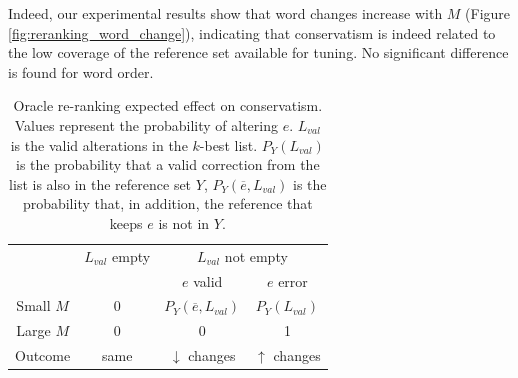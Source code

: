 \documentclass[letterpaper, 11pt]{article}
\begin{document}
Indeed, our experimental results show that word changes increase with $M$ (Figure \ref{fig:reranking_word_change}),
indicating that conservatism is indeed related to the low coverage of the reference set available for tuning.
No significant difference is found for word order.

\begin{table}[t]
	\vspace{-0.5cm}
	\centering
	\small
	\singlespacing
	\begin{tabular}{c|c|cc}
		 & $L_{val}$ empty & \multicolumn{2}{c}{$L_{val}$ not empty} \\
		&            & $e$ valid & $e$ error \\ \hline
		\multicolumn{1}{c|}{Small $M$} & 0 & $P_Y(\overline{e}, L_{val})$ & $P_Y\left(L_{val}\right)$    \\
		\multicolumn{1}{c|}{Large $M$} & 0 & 0              & 1                  \\ \hline
		\multicolumn{1}{c|}{Outcome}            & same  & $\downarrow$ changes        & $\uparrow$ changes
	\end{tabular}
	\caption{\label{ta:oracle_expected_results}
	Oracle re-ranking expected effect on conservatism.
	Values represent the probability of altering $e$. $L_{val}$ is the valid alterations in the $k$-best list. $P_Y\left(L_{val}\right)$ is the probability that a valid correction from the list is also in the reference set $Y$,
	$P_Y(\overline{e}, L_{val})$ is the probability that, in addition, the reference that keeps $e$ is not in $Y$.
	\vspace{-0.5cm}
	}
	

\end{table}
%
\end{document}
